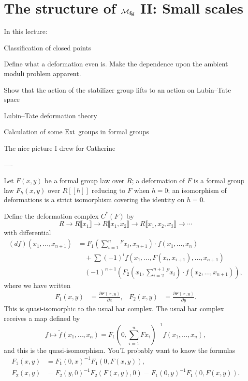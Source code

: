 \section{The structure of $\mathcal{M}_{\mathbf{fg}}$ II: Small scales}

In this lecture:

Classification of closed points

Define what a deformation even is. Make the dependence upon the ambient moduli problem apparent.

Show that the action of the stabilizer group lifts to an action on Lubin--Tate space

Lubin--Tate deformation theory

Calculation of some $\operatorname{Ext}$ groups in formal groups

The nice picture I drew for Catherine



----



Let $F(x, y)$ be a formal group law over $R$; a deformation of $F$ is a formal group law $F_h(x, y)$ over $R[[h]]$ reducing to $F$ when $h = 0$; an isomorphism of deformations is a strict isomorphism covering the identity on $h = 0$.

Define the deformation complex $C^*(F)$ by \[R \to R\llbracket x_1 \rrbracket \to R\llbracket x_1, x_2 \rrbracket \to R\llbracket x_1, x_2, x_3 \rrbracket \to \cdots\] with differential
\begin{align*}
(df)(x_1, \ldots, x_{n+1}) & = F_1\left(\sum_{i=1}^n {}^F x_i, x_{n+1} \right) \cdot f(x_1, \ldots, x_n) \\
& \quad + \sum (-1)^i f(x_1, \ldots, F(x_i, x_{i+1}), \ldots, x_{n+1}) \\
& \quad (-1)^{n+1} \left( F_2\left(x_1, \sum_{i=2}^{n+1} {}^F x_i \right) \cdot f(x_2, \ldots, x_{n+1}) \right),
\end{align*}
where we have written
\begin{align*}
F_1(x, y) & = \frac{\partial F(x, y)}{\partial x}, &
F_2(x, y) & = \frac{\partial F(x, y)}{\partial y}.
\end{align*}
This is quasi-isomorphic to the usual bar complex. The usual bar complex receives a map defined by \[f \mapsto \check{f}(x_1, \ldots, x_n) = F_1\left( 0, \sum_{i=1}^n {}F x_i \right)^{-1} f(x_1, \ldots, x_n),\] and this is the quasi-isomorphism. You'll probably want to know the formulas
\begin{align*}
F_1(x, y) & = F_1(0, x)^{-1} F_1(0, F(x, y)), \\
F_2(x, y) & = F_2(y, 0)^{-1} F_2(F(x, y), 0) = F_1(0, y)^{-1} F_1(0, F(x, y)).
\end{align*}


